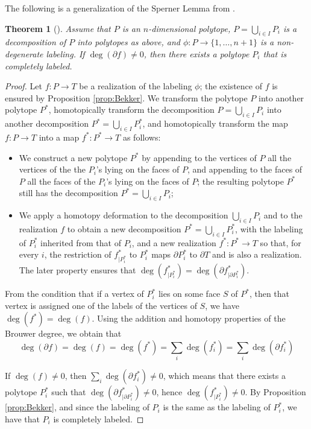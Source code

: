 \documentclass[11pt]{amsart}
\newtheorem{thm}{Theorem}[section]
\theoremstyle{definition}
\theoremstyle{remark}
\numberwithin{equation}{section}
\theoremstyle{definition}
\begin{document}
	
	
	The following is a generalization of the Sperner Lemma from  \cite{Bekker1995}.
	
	
	\begin{thm}[\cite{Bekker1995}]\label{thm:bekker2}
		Assume that $P$ is an $n$-dimensional polytope,  $P=\bigcup_{i\in I}P_i$ is a decomposition of $P$ into polytopes as above, and $\phi:P\to\{1,\ldots,n+1\}$ is a \emph{non-degenerate labeling}.   If $\deg(\partial f)\neq 0$, then there exists a polytope $P_i$ that is completely labeled.
	\end{thm}
	
	\begin{proof}
		Let $f:P\to T$ be a realization of the labeling $\phi$; the existence of $f$ is ensured by Proposition \ref{prop:Bekker}.
		We transform the polytope $P$ into another polytope $P^*$, homotopically transform the  decomposition  $P=\bigcup_{i\in I}P_i$ into another decomposition  $P^*=\bigcup_{i\in I}P^*_i$, and homotopically transform the map
		$f:P\to T$ into a map $f^*:P^*\to T$ as follows:
		\begin{itemize}
			\item We construct a new  polytope $P^*$ by appending  to the  vertices of $P$ all the vertices of the the $P_i$'s lying on the faces of $P$, and appending to the faces of $P$ all the faces of the $P_i$'s lying on the faces of $P$; the resulting polytope $P^*$  still has the decomposition $P^*=\bigcup_{i\in I}P_i$;
			\item We apply a homotopy deformation to the decomposition $\bigcup_{i\in I}P_i$ and to the realization $f$ to obtain a new decomposition  $P^*=\bigcup_{i\in I}P^*_i$, with the labeling of $P^*_i$ inherited from that of $P_i$, and a new realization  $f^*:P^*\to T$ so that, for every $i$, the restriction of $f^*_{\mid {P^*_i}}$ to $P^*_i$ maps $\partial P^*_i$ to $\partial T$ and is also a realization. The later property ensures that $\deg(f^*_{\mid {P^*_i}})=\deg(\partial f^*_{\mid {\partial P^*_i}})$.
		\end{itemize}
		
		From the condition that  if a vertex   of $P^*_i$ lies on some face $S$ of $P^*$, then that vertex is assigned one of the labels of  the vertices of $S$, we have $\deg(f^*) = \deg(f)$.
		Using the addition and homotopy properties of the Brouwer degree, we obtain that
		\[\deg(\partial f) = \deg(f) = \deg(f^*) = \sum_i \deg(f^*_i) =  \sum_i \deg( \partial f^*_i)\]
		
		
		
		If $\deg(f)\neq 0$, then $\sum_i \deg( \partial f^*_i)\neq 0$, which means that  there exists a polytope $P^*_i$ such that $\deg(\partial f^*_{\mid \partial P^*_i})\neq 0$, hence $\deg(f^*_{\mid P^*_i})\neq 0$. By Proposition \ref{prop:Bekker}, and since the labeling of $P_i$ is the same as the labeling of $P^*_i$, we have that $P_i$ is completely labeled.
	\end{proof}
	
\end{document}
